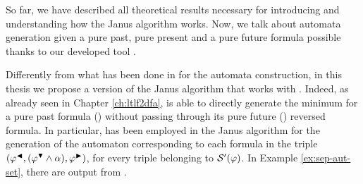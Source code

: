 So far, we have described all theoretical results necessary for introducing and understanding how the Janus algorithm works. Now, we talk about automata generation given a pure past, pure present and a pure future formula possible thanks to our developed tool \LTLfToDFA. 

Differently from what has been done in \citep{cecconi2018interestingness} for the automata construction, in this thesis we propose a version of the Janus algorithm that works with \LTLfToDFA. Indeed, as already seen in Chapter \ref{ch:ltlf2dfa}, \LTLfToDFA is able to directly generate the minimum \DFA for a pure past formula (\PLTL) without passing through its pure future (\LTLf) reversed formula. In particular, \LTLfToDFA has been employed in the Janus algorithm for the generation of the automaton corresponding to each formula in the triple $(\varphi^{\blacktriangleleft},(\varphi^{\blacktriangledown} \lAND \alpha),\varphi^{\blacktriangleright})$, for every triple belonging to $\S'(\varphi)$. In Example \ref{ex:sep-aut-set}, there are \DFAs output from \LTLfToDFA.

